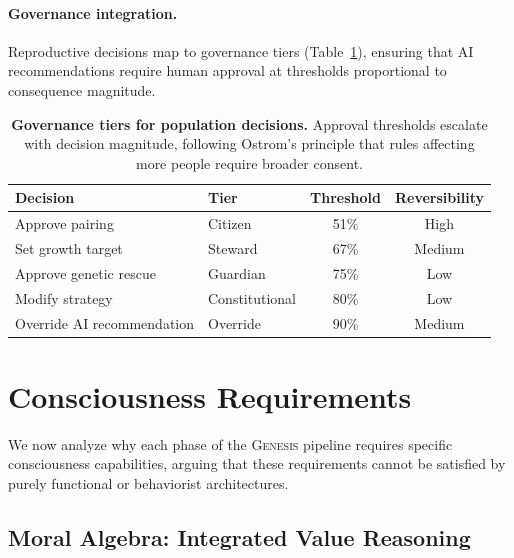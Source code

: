 \documentclass[11pt,letterpaper]{article}
\newcommand{\genesis}{\textsc{Genesis}}
\begin{document}
\paragraph{Governance integration.} Reproductive decisions map to governance
tiers (Table~\ref{tab:governance}), ensuring that AI recommendations require
human approval at thresholds proportional to consequence magnitude.

\begin{table}[htbp]
\centering
\caption{\textbf{Governance tiers for population decisions.} Approval thresholds
escalate with decision magnitude, following Ostrom's \cite{ostrom1990governing}
principle that rules affecting more people require broader consent.}
\label{tab:governance}
\begin{tabular}{llcc}
\toprule
\textbf{Decision} & \textbf{Tier} & \textbf{Threshold} & \textbf{Reversibility} \\
\midrule
Approve pairing & Citizen & 51\% & High \\
Set growth target & Steward & 67\% & Medium \\
Approve genetic rescue & Guardian & 75\% & Low \\
Modify strategy & Constitutional & 80\% & Low \\
Override AI recommendation & Override & 90\% & Medium \\
\bottomrule
\end{tabular}
\end{table}


\section{Consciousness Requirements}
\label{sec:consciousness}

We now analyze why each phase of the \genesis{} pipeline requires specific
consciousness capabilities, arguing that these requirements cannot be satisfied
by purely functional or behaviorist architectures.

\subsection{Moral Algebra: Integrated Value Reasoning}
\end{document}
